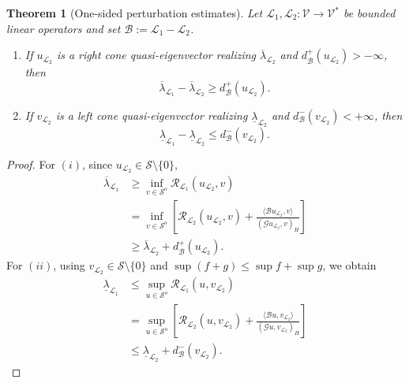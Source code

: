 \documentclass[preprint,10pt]{elsarticle}
\theoremstyle{plain}
\newtheorem{theorem}{Theorem}
\theoremstyle{definition}
\theoremstyle{remark}
\begin{document}
\begin{theorem}[One-sided perturbation estimates]
	\label{thm:stability-G}
	Let \(\mathcal L_1,\mathcal L_2:\mathcal V\to\mathcal V^*\) be bounded
	linear operators and set \(\mathcal B:=\mathcal L_1-\mathcal L_2\).
	\begin{enumerate}[label=\upshape(\roman*)]
		\item If \(u_{\mathcal L_2}\) is a right cone quasi-eigenvector realizing
		\(\overline\lambda_{\mathcal L_2}\) and
		\(d^+_{\mathcal B}(u_{\mathcal L_2})>-\infty\), then
		\begin{equation}\label{eq:upper_stability-G}
			\overline\lambda_{\mathcal L_1}
			-
			\overline\lambda_{\mathcal L_2}
			\ge
			d^+_{\mathcal B}(u_{\mathcal L_2}).
		\end{equation}
		
		\item If \(v_{\mathcal L_2}\) is a left cone quasi-eigenvector realizing
		\(\underline\lambda_{\mathcal L_2}\) and
		\(d^-_{\mathcal B}(v_{\mathcal L_2})<+\infty\), then
		\begin{equation}\label{eq:lower_stability-G}
			\underline\lambda_{\mathcal L_1}
			-
			\underline\lambda_{\mathcal L_2}
			\le
			d^-_{\mathcal B}(v_{\mathcal L_2}).
		\end{equation}
	\end{enumerate}
\end{theorem}

\begin{proof}
	For \((i)\), since \(u_{\mathcal L_2}\in\mathcal S\setminus\{0\}\),
	\[
	\begin{aligned}
		\overline\lambda_{\mathcal L_1}
		&\ge
		\inf_{v\in\mathcal S^o}
		\mathcal R_{\mathcal L_1}(u_{\mathcal L_2},v)
		\\
		&=
		\inf_{v\in\mathcal S^o}
		\left[
		\mathcal R_{\mathcal L_2}(u_{\mathcal L_2},v)
		+
		\frac{\langle \mathcal B u_{\mathcal L_2},v\rangle}
		{(\mathcal G u_{\mathcal L_2},v)_H}
		\right]
		\\
		&\ge
		\overline\lambda_{\mathcal L_2}
		+
		d^+_{\mathcal B}(u_{\mathcal L_2}).
	\end{aligned}
	\]
	For \((ii)\), using \(v_{\mathcal L_2}\in\mathcal S\setminus\{0\}\) and
	\(\sup(f+g)\le \sup f+\sup g\), we obtain
	\[
	\begin{aligned}
		\underline\lambda_{\mathcal L_1}
		&\le
		\sup_{u\in\mathcal S^o}
		\mathcal R_{\mathcal L_1}(u,v_{\mathcal L_2})
		\\
		&=
		\sup_{u\in\mathcal S^o}
		\left[
		\mathcal R_{\mathcal L_2}(u,v_{\mathcal L_2})
		+
		\frac{\langle \mathcal B u,v_{\mathcal L_2}\rangle}
		{(\mathcal G u,v_{\mathcal L_2})_H}
		\right]
		\\
		&\le
		\underline\lambda_{\mathcal L_2}
		+
		d^-_{\mathcal B}(v_{\mathcal L_2}).
	\end{aligned}
	\]
\end{proof}
\end{document}
